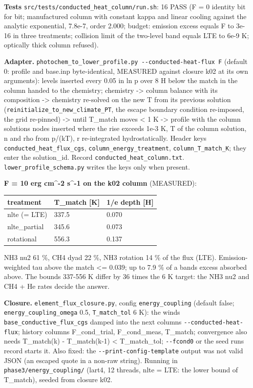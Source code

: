 \documentclass[english,a4paper]{my_memo}
\begin{document}
\textbf{Tests} \texttt{src/tests/conducted\_heat\_column/run.sh}: 16 PASS (F = 0
identity bit for bit; manufactured column with constant kappa and linear
cooling against the analytic exponential, 7.8e-7, order 2.000; budget:
emission excess equals F to 3e-16 in three treatments; collision limit of
the two-level band equals LTE to 6e-9 K; optically thick column refused).

\textbf{Adapter.} \texttt{photochem\_to\_lower\_profile.py\ -\/-conducted-heat-flux\ F}
(default 0: profile and base.inp byte-identical, MEASURED against
closure k02 at its own arguments): levels inserted every 0.05 in ln p over
8 H below the match in the column handed to the chemistry; chemistry
-\textgreater{} column balance with its composition -\textgreater{} chemistry re-solved on the new T
from its previous solution (\texttt{reinitialize\_to\_new\_climate\_PT}, the escape
boundary condition re-imposed, the grid re-pinned) -\textgreater{} until T\_match moves
\textless{} 1 K -\textgreater{} profile with the column solution\textquotesingle s nodes inserted where the rise
exceeds 1e-3 K, T of the column solution, n and rho from p/(kT), r
re-integrated hydrostatically. Header keys \texttt{conducted\_heat\_flux\_cgs},
\texttt{column\_energy\_treatment}, \texttt{column\_T\_match\_K}; they enter the
solution\_id. Record \texttt{conducted\_heat\_column.txt}. \texttt{lower\_profile\_schema.py}
writes the keys only when present.

\textbf{F = 10 erg cm\^{}-2 s\^{}-1 on the k02 column} (MEASURED):

{\def\LTcaptype{none} %
{\small
\begin{longtable}[]{@{}lll@{}}
\toprule\noalign{}
treatment & T\_match {[}K{]} & 1/e depth {[}H{]} \\
\midrule\noalign{}
\endhead
\bottomrule\noalign{}
\endlastfoot
nlte (= LTE) & 337.5 & 0.070 \\
nlte\_partial & 345.6 & 0.073 \\
rotational & 556.3 & 0.137 \\
\end{longtable}
}
}

NH3 nu2 61 \%, CH4 dyad 22 \%, NH3 rotation 14 \% of the flux (LTE).
Emission-weighted tau above the match \textless= 0.039; up to 7.9 \% of a band\textquotesingle s
excess absorbed above. The bounds 337-556 K differ by 36 times the 6 K
target: the NH3 nu2 and CH4 + He rates decide the answer.

\textbf{Closure.} \texttt{element\_flux\_closure.py}, config \texttt{energy\_coupling} (default
false; \texttt{energy\_coupling\_omega} 0.5, \texttt{T\_match\_tol} 6 K): the wind\textquotesingle s
\texttt{base\_conductive\_flux\_cgs} damped into the next column\textquotesingle s
\texttt{-\/-conducted-heat-flux}; history columns F\_cond\_trial, F\_cond\_meas,
T\_match; convergence also needs \textbar T\_match(k) - T\_match(k-1)\textbar{} \textless{} T\_match\_tol;
\texttt{-\/-fcond0} or the seed run\textquotesingle s record starts it. Also fixed: the
\texttt{-\/-print-config-template} output was not valid JSON (an escaped quote in a
non-raw string). Running in \texttt{phase3/energy\_coupling/} (lart4, 12
threads, nlte = LTE: the lower bound of T\_match), seeded from closure k02.
\end{document}
